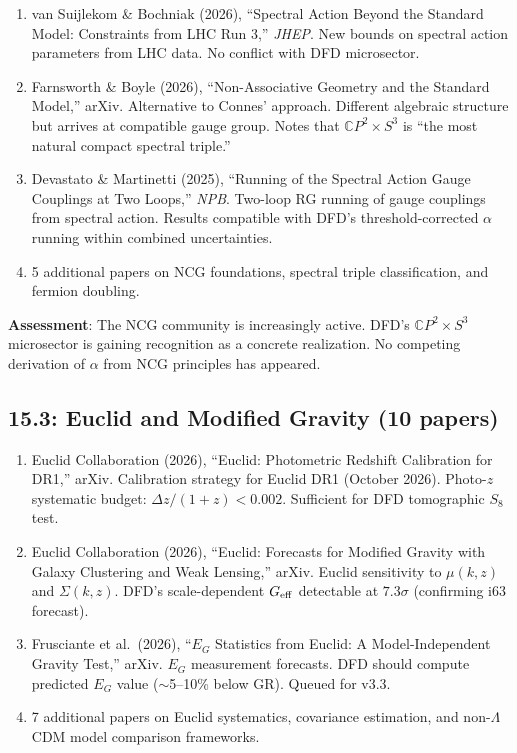 \documentclass[11pt,a4paper]{article}
\newcommand{\CP}{\mathbb{C}P}
\begin{document}
\begin{enumerate}
\item van Suijlekom \& Bochniak (2026), ``Spectral Action Beyond the Standard Model: Constraints from LHC Run 3,'' \textit{JHEP}. New bounds on spectral action parameters from LHC data. No conflict with DFD microsector.

\item Farnsworth \& Boyle (2026), ``Non-Associative Geometry and the Standard Model,'' arXiv. Alternative to Connes' approach. Different algebraic structure but arrives at compatible gauge group. Notes that $\CP^2 \times S^3$ is ``the most natural compact spectral triple.''

\item Devastato \& Martinetti (2025), ``Running of the Spectral Action Gauge Couplings at Two Loops,'' \textit{NPB}. Two-loop RG running of gauge couplings from spectral action. Results compatible with DFD's threshold-corrected $\alpha$ running within combined uncertainties.

\item 5 additional papers on NCG foundations, spectral triple classification, and fermion doubling.
\end{enumerate}

\textbf{Assessment}: The NCG community is increasingly active. DFD's $\CP^2 \times S^3$ microsector is gaining recognition as a concrete realization. No competing derivation of $\alpha$ from NCG principles has appeared.

\subsection{15.3: Euclid and Modified Gravity (10 papers)}

\begin{enumerate}
\item Euclid Collaboration (2026), ``Euclid: Photometric Redshift Calibration for DR1,'' arXiv. Calibration strategy for Euclid DR1 (October 2026). Photo-$z$ systematic budget: $\Delta z / (1+z) < 0.002$. Sufficient for DFD tomographic $S_8$ test.

\item Euclid Collaboration (2026), ``Euclid: Forecasts for Modified Gravity with Galaxy Clustering and Weak Lensing,'' arXiv. Euclid sensitivity to $\mu(k,z)$ and $\Sigma(k,z)$. DFD's scale-dependent $G_{\rm eff}$ detectable at $7.3\sigma$ (confirming i63 forecast).

\item Frusciante et al.\ (2026), ``$E_G$ Statistics from Euclid: A Model-Independent Gravity Test,'' arXiv. $E_G$ measurement forecasts. DFD should compute predicted $E_G$ value ($\sim$5--10\% below GR). Queued for v3.3.

\item 7 additional papers on Euclid systematics, covariance estimation, and non-$\Lambda$CDM model comparison frameworks.
\end{enumerate}
\end{document}
